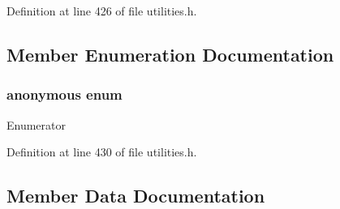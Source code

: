Definition at line 426 of file utilities.\+h.



\subsection{Member Enumeration Documentation}
\hypertarget{structcrap_1_1limits_3_01uint64__t_01_4_adfe5a95e60897f45fbe472df435ea69c}{}\subsubsection[{anonymous enum}]{\setlength{\rightskip}{0pt plus 5cm}anonymous enum}\label{structcrap_1_1limits_3_01uint64__t_01_4_adfe5a95e60897f45fbe472df435ea69c}
\begin{Desc}
\item[Enumerator]\par
\begin{description}
\item[{\em 
\hypertarget{structcrap_1_1limits_3_01uint64__t_01_4_adfe5a95e60897f45fbe472df435ea69ca962c160b3015f0b94e388b3605d4b322}{}I\+S\+\_\+\+I\+N\+T\label{structcrap_1_1limits_3_01uint64__t_01_4_adfe5a95e60897f45fbe472df435ea69ca962c160b3015f0b94e388b3605d4b322}
}]\item[{\em 
\hypertarget{structcrap_1_1limits_3_01uint64__t_01_4_adfe5a95e60897f45fbe472df435ea69cadde2959759a7af0045de5f060765e2eb}{}I\+S\+\_\+\+S\+I\+G\+N\+E\+D\label{structcrap_1_1limits_3_01uint64__t_01_4_adfe5a95e60897f45fbe472df435ea69cadde2959759a7af0045de5f060765e2eb}
}]\end{description}
\end{Desc}


Definition at line 430 of file utilities.\+h.



\subsection{Member Data Documentation}
\hypertarget{structcrap_1_1limits_3_01uint64__t_01_4_a7a37d0e7978b1adc854aad337e523a7b}{}
